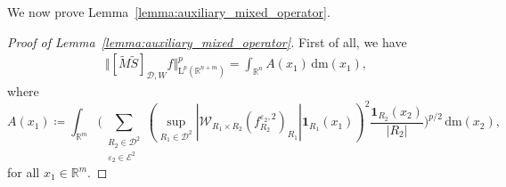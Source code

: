 \documentclass{article}
\theoremstyle{definition}
\theoremstyle{remark}
\numberwithin{equation}{section}
\newcommand{\mathdm}{\,\mathrm{dm}}
\newcommand{\cD}{\mathcal{D}}
\newcommand{\cE}{\mathcal{E}}
\newcommand{\cW}{\mathcal{W}}
\newcommand{\bfD}{\bm{\mathcal{D}}}
\newcommand{\e}{\varepsilon}
\newcommand{\reals}{\mathbb{R}}
\newcommand{\Lp}[1]{\mathrm{L}^{#1}}
\newcommand{\1}{\mathbf{1}}
\begin{document}
    We now prove Lemma~\ref{lemma:auxiliary_mixed_operator}.

    \begin{proof}[Proof of Lemma~\ref{lemma:auxiliary_mixed_operator}]
        First of all, we have
        \begin{align*}
            &\Vert [\widetilde{M}\widetilde{S}]_{\bfD,W}f\Vert_{\Lp{p}(\reals^{n+m})}^{p}=\int_{\reals^n}A(x_1)\mathdm(x_1),
        \end{align*}
        where
        \begin{equation*}
            A(x_1)\coloneq \int_{\reals^m}\bigg(\sum_{\substack{R_2\in\cD^2\\\e_2\in\cE^2}}(\sup_{R_1\in\cD^2}|\cW_{R_1\times R_2}(f_{R_2}^{\e_2,2})_{R_1}|\1_{R_1}(x_1))^2\frac{\1_{R_2}(x_2)}{|R_2|}\bigg)^{p/2}\mathdm(x_2),
        \end{equation*}
        for all $x_1\in\reals^{m}.$
        

\end{proof}
\end{document}
